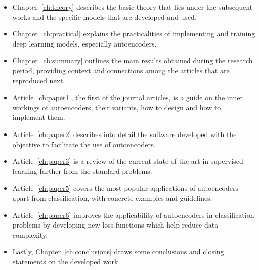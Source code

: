 \begin{itemize}
    \item Chapter~\ref{ch:theory} describes the basic theory that lies under the subsequent works and the specific models that are developed and used.
    \item Chapter~\ref{ch:practical} explains the practicalities of implementing and training deep learning models, especially autoencoders.
    \item Chapter~\ref{ch:summary} outlines the main results obtained during the research period, providing context and connections among the articles that are reproduced next.
    \item Article~\ref{ch:paper1}, the first of the journal articles, is a guide on the inner workings of autoencoders, their variants, how to design and how to implement them.
    \item Article~\ref{ch:paper2} describes into detail the software developed with the objective to facilitate the use of autoencoders.
    \item Article~\ref{ch:paper3} is a review of the current state of the art in supervised learning further from the standard problems.
    \item Article~\ref{ch:paper5} covers the most popular applications of autoencoders apart from classification, with concrete examples and guidelines.
    \item Article~\ref{ch:paper6} improves the applicability of autoencoders in classification problems by developing new loss functions which help reduce data complexity.
    \item Lastly, Chapter~\ref{ch:conclusions} draws some conclusions and closing statements on the developed work.
\end{itemize}